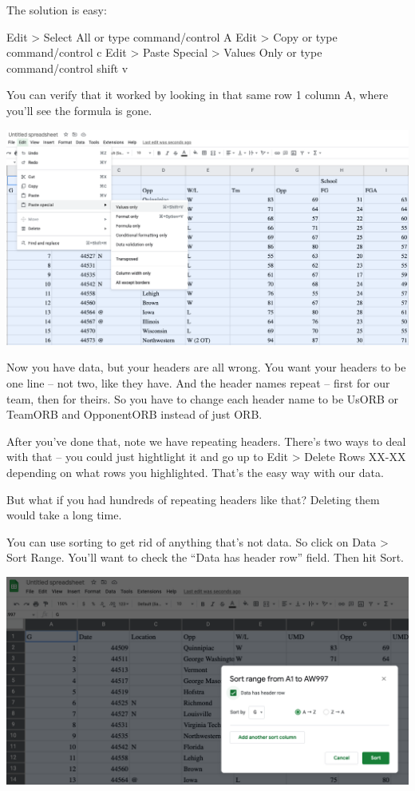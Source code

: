 \documentclass[
]{book}
\begin{document}
The solution is easy:

Edit \textgreater{} Select All or type command/control A
Edit \textgreater{} Copy or type command/control c
Edit \textgreater{} Paste Special \textgreater{} Values Only or type command/control shift v

You can verify that it worked by looking in that same row 1 column A, where you'll see the formula is gone.

\includegraphics[width=36.81in]{images/clean2}

Now you have data, but your headers are all wrong. You want your headers to be one line -- not two, like they have. And the header names repeat -- first for our team, then for theirs. So you have to change each header name to be UsORB or TeamORB and OpponentORB instead of just ORB.

After you've done that, note we have repeating headers. There's two ways to deal with that -- you could just hightlight it and go up to Edit \textgreater{} Delete Rows XX-XX depending on what rows you highlighted. That's the easy way with our data.

But what if you had hundreds of repeating headers like that? Deleting them would take a long time.

You can use sorting to get rid of anything that's not data. So click on Data \textgreater{} Sort Range. You'll want to check the ``Data has header row'' field. Then hit Sort.

\includegraphics[width=21.61in]{images/clean3}
\end{document}
